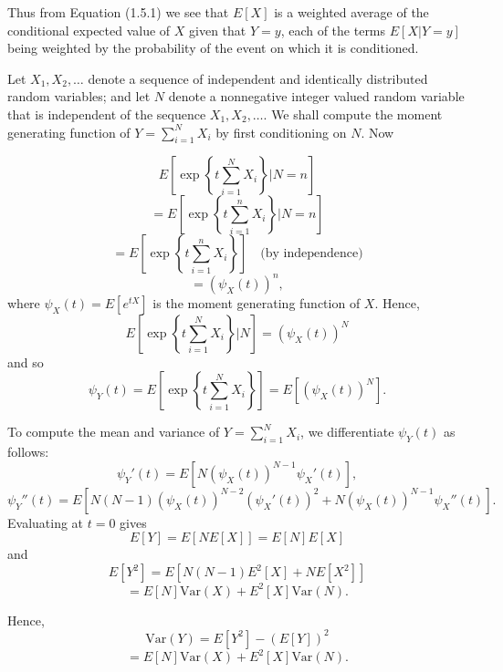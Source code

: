 \documentclass[lang=cn,10pt,thmcnt=section]{elegantbook}
\begin{document}
Thus from Equation (1.5.1) we see that $E[X]$ is a weighted average of the conditional expected value of $X$ given that $Y = y$, each of the terms $E[X | Y = y]$ being weighted by the probability of the event on which it is conditioned.

\begin{example}
    Let \(X_1, X_2, \ldots\) denote a sequence of independent and identically distributed random variables; and let \(N\) denote a nonnegative integer valued random variable that is independent of the sequence \(X_1, X_2, \ldots\). We shall compute the moment generating function of \(Y = \sum_{i=1}^N X_i\) by first conditioning on \(N\). Now

	\[
	E\left[\exp\left\{t \sum_{i=1}^N X_i\right\} \bigg| N = n\right]
	\]
	\[
	= E\left[\exp\left\{t \sum_{i=1}^n X_i\right\} \bigg| N = n\right]
	\]
	\[
	= E\left[\exp\left\{t \sum_{i=1}^n X_i\right\}\right] \quad \text{(by independence)}
	\]
	\[
	= (\psi_X(t))^n,
	\]
	where \(\psi_X(t) = E[e^{tX}]\) is the moment generating function of \(X\). Hence,
	\[
	E\left[\exp\left\{t \sum_{i=1}^N X_i\right\} \bigg| N\right] = (\psi_X(t))^N
	\]
	and so
	\[
	\psi_Y(t) = E\left[\exp\left\{t \sum_{i=1}^N X_i\right\}\right] = E[(\psi_X(t))^N].
	\]
	
	To compute the mean and variance of \(Y = \sum_{i=1}^N X_i\), we differentiate \(\psi_Y(t)\) as follows:
	\[
	\psi_Y'(t) = E[N (\psi_X(t))^{N-1} \psi_X'(t)],
	\]
	\[
	\psi_Y''(t) = E[N(N - 1) (\psi_X(t))^{N-2} (\psi_X'(t))^2 + N (\psi_X(t))^{N-1} \psi_X''(t)].
	\]
	Evaluating at \(t = 0\) gives
	\[
	E[Y] = E[N E[X]] = E[N] E[X]
	\]
	and
	\[
	E[Y^2] = E[N(N - 1) E^2[X] + N E[X^2]]
	\]
	\[
	= E[N] \text{Var}(X) + E^2[X] \text{Var}(N).
	\]
	
	Hence,
	\[
	\text{Var}(Y) = E[Y^2] - (E[Y])^2
	\]
	\[
	= E[N] \text{Var}(X) + E^2[X] \text{Var}(N).
	\]
\end{example}
\end{document}
